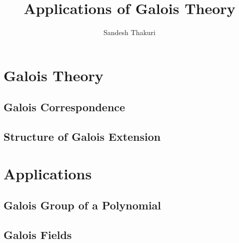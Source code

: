 \documentclass[a4paper,12pt,oneside,onecolumn,openany,final]{memoir}
\title{Applications of Galois Theory}
\author{Sandesh Thakuri}
\begin{document}
\frontmatter






\tableofcontents  %

\mainmatter



\part{Galois Theory}
\chapter{Galois Correspondence}


%

\chapter{Structure of Galois Extension}




\part{Applications}
\chapter{Galois Group of a Polynomial}


\chapter{Galois Fields}

\end{document}
